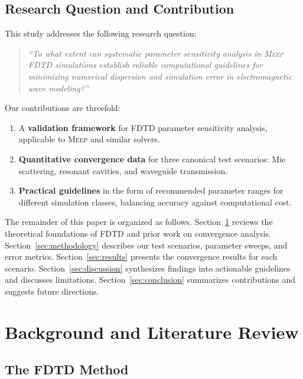 \documentclass[12pt, a4paper]{article}
\newcommand{\meep}{\textsc{Meep}}
\newcommand{\fdtd}{\textsc{FDTD}}
\begin{document}
\subsection{Research Question and Contribution}

This study addresses the following research question:

\begin{quote}
\textit{``To what extent can systematic parameter sensitivity analysis in \meep{} \fdtd{} simulations establish reliable computational guidelines for minimizing numerical dispersion and simulation error in electromagnetic wave modeling?''}
\end{quote}

Our contributions are threefold:
\begin{enumerate}
    \item A \textbf{validation framework} for \fdtd{} parameter sensitivity analysis, applicable to \meep{} and similar solvers.
    \item \textbf{Quantitative convergence data} for three canonical test scenarios: Mie scattering, resonant cavities, and waveguide transmission.
    \item \textbf{Practical guidelines} in the form of recommended parameter ranges for different simulation classes, balancing accuracy against computational cost.
\end{enumerate}

The remainder of this paper is organized as follows. Section~\ref{sec:background} reviews the theoretical foundations of \fdtd{} and prior work on convergence analysis. Section~\ref{sec:methodology} describes our test scenarios, parameter sweeps, and error metrics. Section~\ref{sec:results} presents the convergence results for each scenario. Section~\ref{sec:discussion} synthesizes findings into actionable guidelines and discusses limitations. Section~\ref{sec:conclusion} summarizes contributions and suggests future directions.


\section{Background and Literature Review}
\label{sec:background}

\subsection{The FDTD Method}
\end{document}
